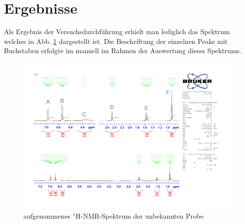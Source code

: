 \section{Ergebnisse}
\label{sec:ergebnisse}

Als Ergebnis der Versuchsdurchführung erhielt man lediglich das Spektrum welches in Abb. \ref{fig:spektrum_original} dargestellt ist. Die Beschriftung der einzelnen Peaks mit Buchstaben erfolgte im manuell im Rahmen der Auswertung dieses Spektrums.

\begin{figure}[h!]
		\centering
		\includegraphics[page=1, width=\textwidth]{dokumente/spektrum_original.pdf}
		\caption{aufgenommenes ${}^1$H-NMR-Spektrum der unbekannten Probe}
		\label{fig:spektrum_original}
\end{figure}
\FloatBarrier
